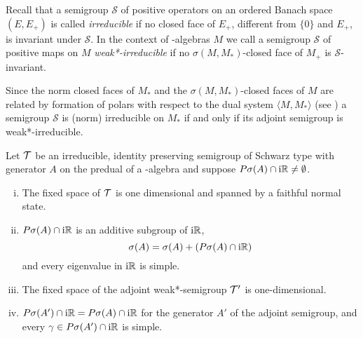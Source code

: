 Recall that a semigroup $\mathcal{S}$ of positive operators on an ordered Banach space $(E,E_{+})$ is called \emph{irreducible} if no closed face of $E_{+}$, different from $\{0\}$ and $E_{+}$, is invariant under $\mathcal{S}$.
In the context of \WA-algebras $M$ we call a semigroup $\mathcal{S}$ of positive maps on $M$ \emph{weak*-irreducible} if no $\sigma(M,M_{*})$-closed face of $M_{+}$ is $\mathcal{S}$-invariant.

Since the norm closed faces of $M_{*}$ and the $\sigma(M,M_{*})$-closed faces of $M$ are related by formation of polars with respect to the dual system $\langle M,M_{*} \rangle$ (see \citet[Theorem 3.6.11 and Theorem 3.10.7.]{pedersen:1979}) a semigroup $\mathcal{S}$ is (norm) irreducible on $M_{*}$ if and only if its adjoint semigroup is weak*-irreducible.
\begin{theorem}\label{thm:d3-1.11}
Let $\mathcal{T}$ be an irreducible, identity preserving semigroup of Schwarz type with generator $A$ on the predual of a \WA-algebra and suppose $P\sigma(A) \cap \mathrm{i}\mathbb{R} \neq \emptyset$.
\begin{enumerate}[(i)]
\item 
The fixed space of $\mathcal{T}$ is one dimensional and spanned by a faithful normal state.

\item 
$P\sigma(A) \cap \mathrm{i}\mathbb{R}$ is an additive subgroup of $\mathrm{i}\mathbb{R}$,
\[
\sigma(A) = \sigma(A) + (P\sigma(A) \cap \mathrm{i}\mathbb{R})
\]
and every eigenvalue in $\mathrm{i}\mathbb{R}$ is simple.

\item 
The fixed space of the adjoint weak*-semigroup $\mathcal{T}'$ is one-dimensional.

\item 
$P{\sigma}(A') \cap \mathrm{i}\mathbb{R} = P\sigma(A) \cap \mathrm{i}\mathbb{R}$ for the generator $A'$ of the adjoint semigroup, and every $\gamma \in P{\sigma}(A') \cap \mathrm{i}\mathbb{R}$ is simple.
\end{enumerate}
\end{theorem}
